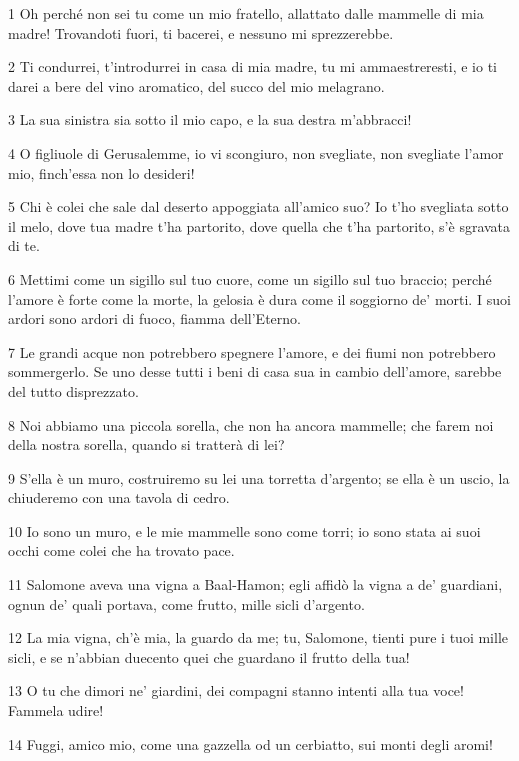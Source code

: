 \par 1 Oh perché non sei tu come un mio fratello, allattato dalle mammelle di mia madre! Trovandoti fuori, ti bacerei, e nessuno mi sprezzerebbe.
\par 2 Ti condurrei, t'introdurrei in casa di mia madre, tu mi ammaestreresti, e io ti darei a bere del vino aromatico, del succo del mio melagrano.
\par 3 La sua sinistra sia sotto il mio capo, e la sua destra m'abbracci!
\par 4 O figliuole di Gerusalemme, io vi scongiuro, non svegliate, non svegliate l'amor mio, finch'essa non lo desideri!
\par 5 Chi è colei che sale dal deserto appoggiata all'amico suo? Io t'ho svegliata sotto il melo, dove tua madre t'ha partorito, dove quella che t'ha partorito, s'è sgravata di te.
\par 6 Mettimi come un sigillo sul tuo cuore, come un sigillo sul tuo braccio; perché l'amore è forte come la morte, la gelosia è dura come il soggiorno de' morti. I suoi ardori sono ardori di fuoco, fiamma dell'Eterno.
\par 7 Le grandi acque non potrebbero spegnere l'amore, e dei fiumi non potrebbero sommergerlo. Se uno desse tutti i beni di casa sua in cambio dell'amore, sarebbe del tutto disprezzato.
\par 8 Noi abbiamo una piccola sorella, che non ha ancora mammelle; che farem noi della nostra sorella, quando si tratterà di lei?
\par 9 S'ella è un muro, costruiremo su lei una torretta d'argento; se ella è un uscio, la chiuderemo con una tavola di cedro.
\par 10 Io sono un muro, e le mie mammelle sono come torri; io sono stata ai suoi occhi come colei che ha trovato pace.
\par 11 Salomone aveva una vigna a Baal-Hamon; egli affidò la vigna a de' guardiani, ognun de' quali portava, come frutto, mille sicli d'argento.
\par 12 La mia vigna, ch'è mia, la guardo da me; tu, Salomone, tienti pure i tuoi mille sicli, e se n'abbian duecento quei che guardano il frutto della tua!
\par 13 O tu che dimori ne' giardini, dei compagni stanno intenti alla tua voce! Fammela udire!
\par 14 Fuggi, amico mio, come una gazzella od un cerbiatto, sui monti degli aromi!


